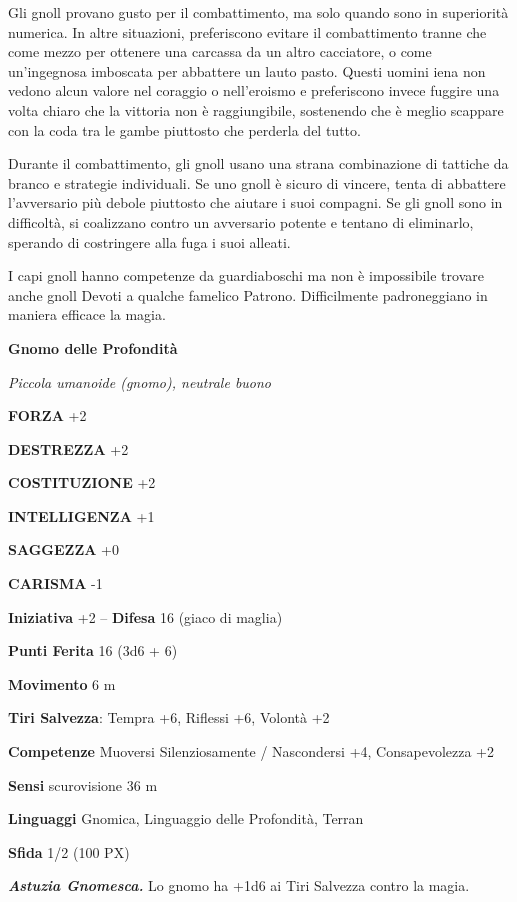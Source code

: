 \begin{multicols}{2}
	Gli gnoll provano gusto per il combattimento, ma solo quando sono in superiorità numerica. In altre situazioni, preferiscono evitare il combattimento tranne che come mezzo per ottenere una carcassa da un altro cacciatore, o come un'ingegnosa imboscata per abbattere un lauto pasto. Questi uomini iena non vedono alcun valore nel coraggio o nell'eroismo e preferiscono invece fuggire una volta chiaro che la vittoria non è raggiungibile, sostenendo che è meglio scappare con la coda tra le gambe piuttosto che perderla del tutto.

	Durante il combattimento, gli gnoll usano una strana combinazione di tattiche da branco e strategie individuali. Se uno gnoll è sicuro di vincere, tenta di abbattere l'avversario più debole piuttosto che aiutare i suoi compagni. Se gli gnoll sono in difficoltà, si coalizzano contro un avversario potente e tentano di eliminarlo, sperando di costringere alla fuga i suoi alleati.

	I capi gnoll hanno competenze da guardiaboschi ma non è impossibile trovare anche gnoll Devoti a qualche famelico Patrono. Difficilmente padroneggiano in maniera efficace la magia.


	\medskip{}\textbf{Gnomo delle Profondità}

	\textit{Piccola umanoide (gnomo), neutrale buono}

	\textbf{FORZA} +2

	\textbf{DESTREZZA} +2

	\textbf{COSTITUZIONE} +2

	\textbf{INTELLIGENZA} +1

	\textbf{SAGGEZZA} +0

	\textbf{CARISMA} -1

	\textbf{Iniziativa} +2 -- \textbf{Difesa} 16 (giaco di maglia)

	\textbf{Punti Ferita} 16 (3d6 + 6)

	\textbf{Movimento} 6 m

	\textbf{Tiri Salvezza}: Tempra +6, Riflessi +6, Volontà +2

	\textbf{Competenze} Muoversi Silenziosamente / Nascondersi +4, Consapevolezza +2

	\textbf{Sensi} scurovisione 36 m

	\textbf{Linguaggi} Gnomica, Linguaggio delle Profondità, Terran

	\textbf{Sfida} 1/2 (100 PX)

	\textit{\textbf{Astuzia Gnomesca.}} Lo gnomo ha +1d6 ai Tiri Salvezza contro la magia.


\end{multicols}
